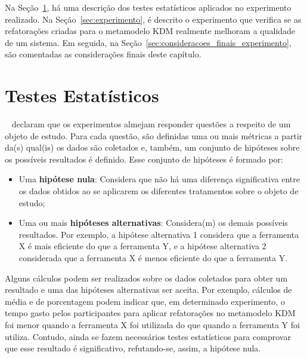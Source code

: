 Na Seção~\ref{sec:teste_estatisticos}, há uma descrição dos testes estatísticos aplicados no experimento realizado. Na Seção~\ref{sec:experimento}, é descrito o experimento que verifica se as refatorações criadas para o metamodelo KDM realmente melhoram a qualidade de um sistema. Em seguida, na Seção~\ref{sec:consideracoes_finais_experimento}, são comentadas as considerações finais deste capítulo.


\section{Testes Estatísticos}\label{sec:teste_estatisticos}

~ declaram que os experimentos almejam responder questões a respeito de um objeto de estudo. Para cada questão, são definidas uma ou mais métricas a partir da(s) qual(is) os dados são coletados e, também, um conjunto de hipóteses sobre os possíveis resultados é definido. Esse conjunto de hipóteses é formado por:

\begin{itemize}
\item Uma \textbf{hipótese nula}: Considera que não há uma diferença significativa entre os dados obtidos ao se aplicarem os diferentes tratamentos sobre o objeto de estudo;
\item Uma ou mais \textbf{hipóteses alternativas}: Considera(m) os demais possíveis resultados. Por exemplo, a hipótese alternativa 1 considera que a ferramenta X é mais eficiente do que a ferramenta Y, e a hipótese alternativa 2 considerada que a ferramenta X é menos eficiente do que a ferramenta Y.
\end{itemize}

Alguns cálculos podem ser realizados sobre os dados coletados para obter um resultado e uma das hipóteses alternativas ser aceita. Por exemplo, cálculos de média e de porcentagem podem indicar que, em determinado experimento, o tempo gasto pelos participantes para aplicar refatorações no metamodelo KDM foi menor quando a ferramenta X foi utilizada do que quando a ferramenta Y foi utiliza. Contudo, ainda se fazem necessários testes estatísticos para comprovar que esse resultado é significativo, refutando-se, assim, a hipótese nula.

